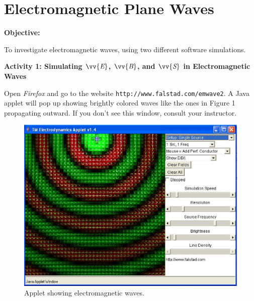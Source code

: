 \section{Electromagnetic Plane Waves}

\makelabheader %

\bigskip
\textbf{Objective:} 


To investigate electromagnetic waves, using two different software simulations.


\bigskip

\textbf{Activity 1: Simulating $\vv{\textit{E}}$, $\vv{\textit{B}}$, and $\vv{\textit{S}}$ in Electromagnetic Waves}


Open \textit{Firefox} and go to the website
\verb!http://www.falstad.com/emwave2!. A Java applet will pop up showing
brightly colored waves like the ones in Figure 1 propagating outward. 
If you don't see this window, consult your instructor.
\begin{figure}[hbt]
\begin{center}
\includegraphics[width=6.0in]{plane_waves/emwaves1.eps}
\caption{Applet showing electromagnetic waves.}
\end{center}
\end{figure}

